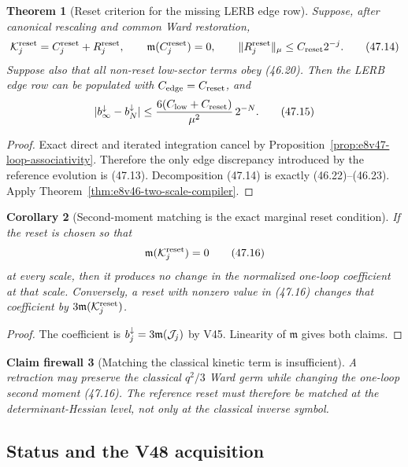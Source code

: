 \documentclass[11pt,oneside]{book}
\newtheorem{theorem}{Theorem}[chapter]
\newtheorem{corollary}[theorem]{Corollary}
\newtheorem{firewall}[theorem]{Claim firewall}
\theoremstyle{definition}
\theoremstyle{remark}
\begin{document}
\begin{theorem}[Reset criterion for the missing LERB edge row]
\label{thm:e8v47-reset-LERB}
Suppose, after canonical rescaling and common Ward restoration,
\[
 {\cal K}^{\rm reset}_j=C_j^{\rm reset}+R_j^{\rm reset},
 \qquad {\mathfrak m}(C_j^{\rm reset})=0,\qquad
 \|R_j^{\rm reset}\|_\mu\le C_{\rm reset}2^{-j}.               \tag{47.14}
\]
Suppose also that all non-reset low-sector terms obey (46.20).
Then the LERB edge row can be populated with
\(C_{\rm edge}=C_{\rm reset}\), and
\[
 |b_\infty^\downarrow-b_N^\downarrow|
 \le
 \frac{6(C_{\rm low}+C_{\rm reset})}{\mu^2}\,2^{-N}.           \tag{47.15}
\]
\end{theorem}

\begin{proof}
Exact direct and iterated integration cancel by
Proposition~\ref{prop:e8v47-loop-associativity}.  Therefore the
only edge discrepancy introduced by the reference evolution is
(47.13).  Decomposition (47.14) is exactly (46.22)--(46.23).
Apply Theorem~\ref{thm:e8v46-two-scale-compiler}.
\end{proof}

\begin{corollary}[Second-moment matching is the exact marginal
reset condition]
\label{cor:e8v47-moment-matching}
If the reset is chosen so that
\[
 {\mathfrak m}({\cal K}^{\rm reset}_j)=0                      \tag{47.16}
\]
at every scale, then it produces no change in the normalized
one-loop coefficient at that scale.  Conversely, a reset with
nonzero value in (47.16) changes that coefficient by
\(3{\mathfrak m}({\cal K}^{\rm reset}_j)\).
\end{corollary}

\begin{proof}
The coefficient is
\(b_j^\downarrow=3{\mathfrak m}({\cal J}_j)\) by V45.
Linearity of \(\mathfrak m\) gives both claims.
\end{proof}

\begin{firewall}[Matching the classical kinetic term is
insufficient]
\label{fire:e8v47-classical-vs-loop}
A retraction may preserve the classical \(q^2/3\) Ward germ while
changing the one-loop second moment (47.16).  The reference reset
must therefore be matched at the determinant-Hessian level, not
only at the classical inverse symbol.
\end{firewall}

\subsection{Status and the V48 acquisition}
\end{document}
